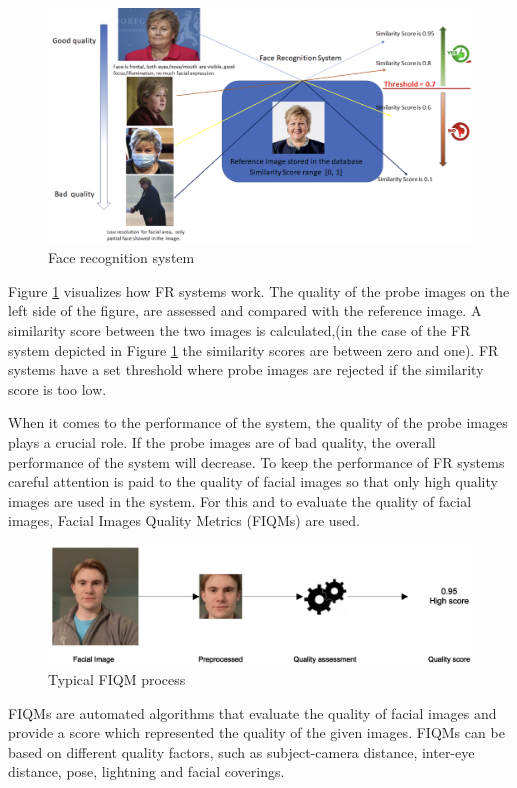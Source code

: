 \begin{figure}[h]
    \centering
    \includegraphics[scale = 0.45]{figures/Erna.png}
    \caption{Face recognition system}
    \label{fig:erna}
\end{figure}

Figure \ref{fig:erna} visualizes how FR systems work. The quality of the probe images on the left side of the figure, are assessed and compared with the reference image. A similarity score between the two images is calculated,(in the case of the FR system depicted in Figure \ref{fig:erna} the similarity scores are between zero and one). FR systems have a set threshold where probe images are rejected if the similarity score is too low. 

When it comes to the performance of the system, the quality of the probe images plays a crucial role. If the probe images are of bad quality, the overall performance of the system will decrease.  To keep the performance of FR systems careful attention is paid to the quality of facial images so that only high quality images are used in the system. For this and to evaluate the quality of facial images, Facial Images Quality Metrics (FIQMs) are used.
%
\begin{figure}[h]
    \centering
    \includegraphics[scale = 0.45]{figures/FIQM_process.png}
    \caption{Typical FIQM process \cite{FaceImageQualityAssessment}}
    \label{fig:fiqm}
\end{figure}
%
FIQMs are automated algorithms that evaluate the quality of facial images and provide a score which represented the quality of the given images. FIQMs can be based on different quality factors, such as subject-camera distance, inter-eye distance, pose, lightning and facial coverings. %

